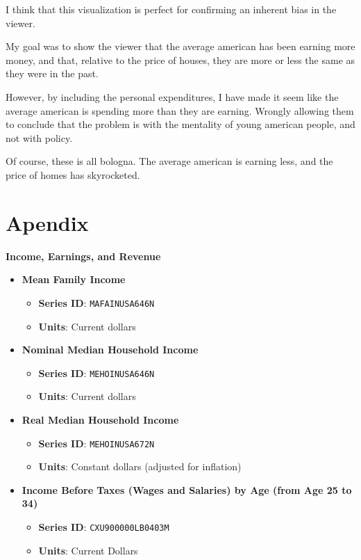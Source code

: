 \documentclass{article}
\begin{document}
I think that this visualization is perfect for confirming an inherent bias in the viewer.

My goal was to show the viewer that the average american has been earning more money, and that, 
relative to the price of houses, they are more or less the same as they were in the past.

However, by including the personal expenditures, 
I have made it seem like the average american is spending more than they are earning.
Wrongly allowing them to conclude that the problem is with the mentality of young american people, and not with policy.

Of course, these is all bologna. The average american is earning less, and the price of homes has skyrocketed.

\newpage
\section{Apendix}
\label{sec:apendix}


\textbf{Income, Earnings, and Revenue}
\begin{itemize} 
  \item \textbf{Mean Family Income} 
  \begin{itemize} 
    \item \textbf{Series ID}: \texttt{MAFAINUSA646N} 
    \item \textbf{Units}: Current dollars 
  \end{itemize}

  \item \textbf{Nominal Median Household Income} 
  \begin{itemize} 
    \item \textbf{Series ID}: \texttt{MEHOINUSA646N} 
    \item \textbf{Units}: Current dollars 
  \end{itemize}

  \item \textbf{Real Median Household Income}
  \begin{itemize}
      \item \textbf{Series ID}: \texttt{MEHOINUSA672N}
      \item \textbf{Units}: Constant dollars (adjusted for inflation)
  \end{itemize}

  \item \textbf{Income Before Taxes (Wages and Salaries) by Age (from Age 25 to 34)}
  \begin{itemize}
      \item \textbf{Series ID}: \texttt{CXU900000LB0403M}
      \item \textbf{Units}: Current Dollars
  \end{itemize}
\end{itemize}
\end{document}
